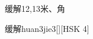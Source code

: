 \begin{entry}{缓解}{12,13}{⽶、⾓}
  \begin{phonetics}{缓解}{huan3jie3}[][HSK 4]
  \end{phonetics}
\end{entry}
